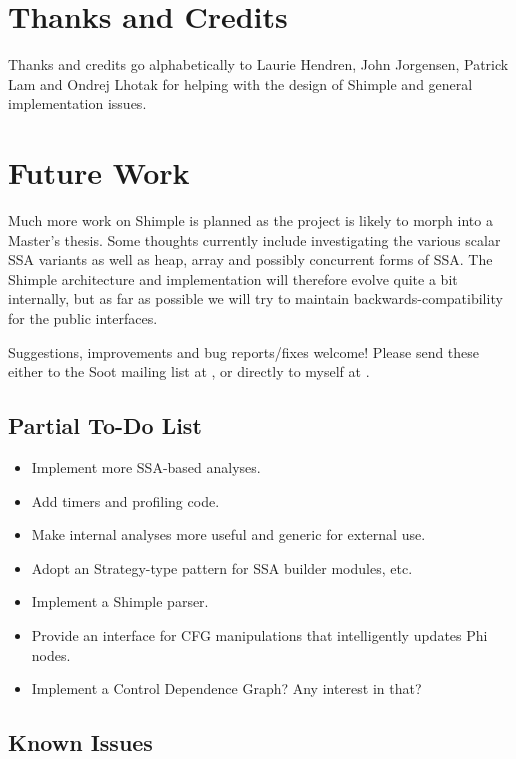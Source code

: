 \documentclass[10pt,letterpaper,oneside,onecolumn]{article}
\begin{document}
\section{Thanks and Credits}

Thanks and credits go alphabetically to Laurie Hendren, John
Jorgensen, Patrick Lam and Ondrej Lhotak for helping with the design
of Shimple and general implementation issues.

\section{Future Work}

Much more work on Shimple is planned as the project is likely to morph
into a Master's thesis.  Some thoughts currently include investigating
the various scalar SSA variants as well as heap, array and possibly
concurrent forms of SSA.  The Shimple architecture and implementation
will therefore evolve quite a bit internally, but as far as possible
we will try to maintain backwards-compatibility for the public
interfaces.

Suggestions, improvements and bug reports/fixes welcome!  Please send
these either to the Soot mailing list at
, or directly to myself
at
.

\subsection{Partial To-Do List}

\begin{itemize}
\item Implement more SSA-based analyses.
\item Add timers and profiling code.
\item Make internal analyses more useful and generic for external use.
\item Adopt an Strategy-type pattern for SSA builder modules, etc.
\item Implement a Shimple parser.
\item Provide an interface for CFG manipulations that intelligently 
updates Phi nodes.
\item Implement a Control Dependence Graph?  Any interest in that?
\end{itemize}

\subsection{Known Issues}
\end{document}
